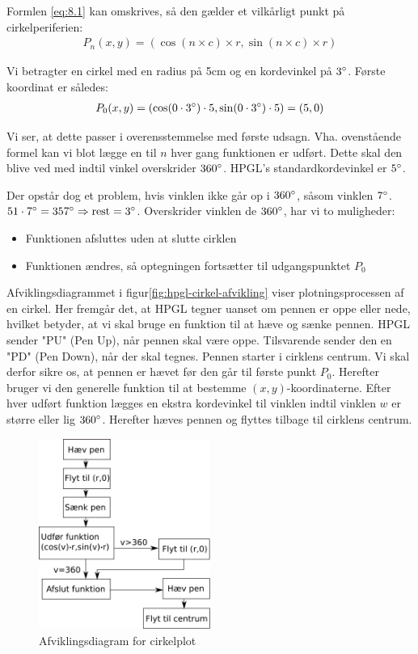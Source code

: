 Formlen \vref{eq:8.1} kan omskrives, så den gælder et vilkårligt punkt
på cirkelperiferien:
\begin{align}
P_n(x, y)=(\cos(n\times c)\times r, \sin(n\times c)\times r)
\end{align}

Vi betragter en cirkel med en radius på 5cm og en kordevinkel på
$3^\circ$. Første koordinat er således:
\begin{align*}
  P_0(x, y)&=(\cos(0\cdot 3^\circ)\cdot 5 , \sin(0\cdot 3^\circ)\cdot 5)=(5, 0) \\
\end{align*}

Vi ser, at dette passer i overensstemmelse med første
udsagn. Vha. ovenstående formel kan vi blot lægge en til $n$ hver gang
funktionen er udført. Dette skal den blive ved med indtil vinkel
overskrider $360^\circ$. HPGL's standardkordevinkel er $5^\circ$.


Der opstår dog et problem, hvis vinklen ikke går op i $360^\circ$,
såsom vinklen $7^\circ$. $51\cdot 7^\circ = 357^\circ \Rightarrow
\textup{rest} = 3^\circ$. Overskrider vinklen de $360^\circ$, har vi
to muligheder:
\begin{itemize} \firmlist
\item Funktionen afsluttes uden at slutte cirklen
\item Funktionen ændres, så optegningen fortsætter til udgangspunktet $P_0$
\end{itemize}

Afviklingsdiagrammet i figur\vref{fig:hpgl-cirkel-afvikling}
viser plotningsprocessen af en cirkel. Her fremgår det, at
HPGL tegner uanset om pennen er oppe eller nede, hvilket betyder, at
vi skal bruge en funktion til at hæve og sænke pennen. HPGL sender
"PU" (Pen Up), når pennen skal være oppe. Tilsvarende sender den en
"PD" (Pen Down), når der skal tegnes. Pennen starter i cirklens
centrum. Vi skal derfor sikre os, at pennen er hævet før den går til
første punkt $P_0$. Herefter bruger vi den generelle funktion til at
bestemme $(x, y)$-koordinaterne. Efter hver udført funktion lægges en
ekstra kordevinkel til vinklen indtil vinklen $w$ er større eller lig
$360^\circ$. Herefter hæves pennen og flyttes tilbage til cirklens
centrum.

\begin{figure}[htbp]
  \centering
  \includegraphics[width=0.5\textwidth]{./img/afviklingsdiagram-cirkel}
  \caption{Afviklingsdiagram for cirkelplot}
  \label{fig:hpgl-cirkel-afvikling}
\end{figure}


